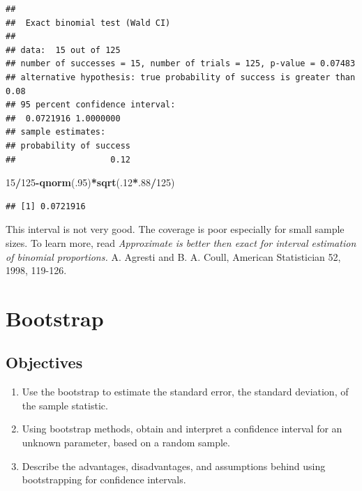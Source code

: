 \documentclass[
]{book}
\newenvironment{Shaded}{\begin{snugshade}}{\end{snugshade}}
\newcommand{\DecValTok}[1]{\textcolor[rgb]{0.00,0.00,0.81}{#1}}
\newcommand{\KeywordTok}[1]{\textcolor[rgb]{0.13,0.29,0.53}{\textbf{#1}}}
\newcommand{\NormalTok}[1]{#1}
\newcommand{\OperatorTok}[1]{\textcolor[rgb]{0.81,0.36,0.00}{\textbf{#1}}}
\providecommand{\tightlist}{%
  \setlength{\itemsep}{0pt}\setlength{\parskip}{0pt}}
\begin{document}
\begin{verbatim}
## 
##  Exact binomial test (Wald CI)
## 
## data:  15 out of 125
## number of successes = 15, number of trials = 125, p-value = 0.07483
## alternative hypothesis: true probability of success is greater than 0.08
## 95 percent confidence interval:
##  0.0721916 1.0000000
## sample estimates:
## probability of success 
##                   0.12
\end{verbatim}

\begin{Shaded}
\begin{Highlighting}[]
\DecValTok{15}\OperatorTok{/}\DecValTok{125}\OperatorTok{-}\KeywordTok{qnorm}\NormalTok{(.}\DecValTok{95}\NormalTok{)}\OperatorTok{*}\KeywordTok{sqrt}\NormalTok{(.}\DecValTok{12}\OperatorTok{*}\NormalTok{.}\DecValTok{88}\OperatorTok{/}\DecValTok{125}\NormalTok{)}
\end{Highlighting}
\end{Shaded}

\begin{verbatim}
## [1] 0.0721916
\end{verbatim}

This interval is not very good. The coverage is poor especially for small sample sizes. To learn more, read \emph{Approximate is better then exact for interval estimation of binomial proportions.} A. Agresti and B. A. Coull, American Statistician 52, 1998, 119-126.

\hypertarget{BOOT}{%
\chapter{Bootstrap}\label{BOOT}}

\hypertarget{objectives-21}{%
\section{Objectives}\label{objectives-21}}

\begin{enumerate}
\def\labelenumi{\arabic{enumi})}
\tightlist
\item
  Use the bootstrap to estimate the standard error, the standard deviation, of the sample statistic.\\
\item
  Using bootstrap methods, obtain and interpret a confidence interval for an unknown parameter, based on a random sample.\\
\item
  Describe the advantages, disadvantages, and assumptions behind using bootstrapping for confidence intervals.
\end{enumerate}
\end{document}
